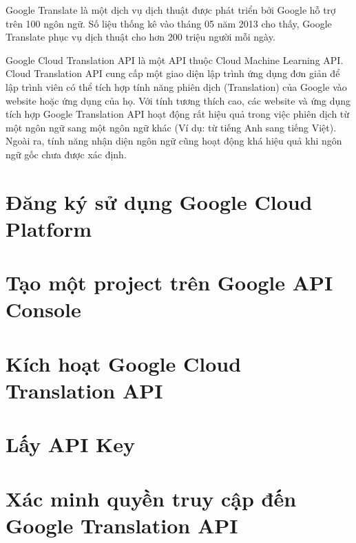 \documentclass[../thesis.tex]{subfiles}
\begin{document}
Google Translate là một dịch vụ dịch thuật được phát triển bởi Google hỗ trợ trên 100 ngôn ngữ. Số liệu thống kê vào tháng 05 năm 2013 cho thấy, Google Translate phục vụ dịch thuật cho hơn 200 triệu người mỗi ngày.

Google Cloud Translation API là một API thuộc Cloud Machine Learning API. Cloud Translation API cung cấp một giao diện lập trình ứng dụng đơn giản để lập trình viên có thể tích hợp tính năng phiên dịch (Translation) của Google vào website hoặc ứng dụng của họ. Với tính tương thích cao, các website và ứng dụng tích hợp Google Translation API hoạt động rất hiệu quả trong việc phiên dịch từ một ngôn ngữ sang một ngôn ngữ khác (Ví dụ: từ tiếng Anh sang tiếng Việt). Ngoài ra, tính năng nhận diện ngôn ngữ cũng hoạt động khá hiệu quả khi ngôn ngữ gốc chưa được xác định.

\section{Đăng ký sử dụng Google Cloud Platform}

\section{Tạo một project trên Google API Console}

\section{Kích hoạt Google Cloud Translation API}

\section{Lấy API Key}

\section{Xác minh quyền truy cập đến Google Translation API}
\end{document}
